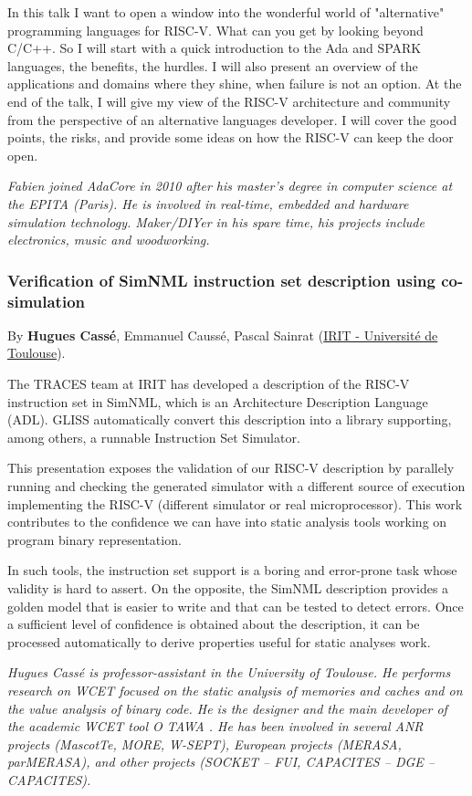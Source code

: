 \documentclass[a4paper, 10pt]{article}
\begin{document}
{In this talk I want to open a window into the wonderful world of
"alternative" programming languages for RISC-V. What can you get by
looking beyond C/C++.
So I will start with a quick introduction to the Ada and SPARK
languages, the benefits, the hurdles. I will also present an overview of
the applications and domains where they shine, when failure is not an
option.
At the end of the talk, I will give my view of the RISC-V architecture
and community from the perspective of an alternative languages
developer. I will cover the good points, the risks, and provide some
ideas on how the RISC-V can keep the door open.

\emph{\footnotesize Fabien joined AdaCore in 2010 after his master's degree in computer science at the EPITA (Paris). He is involved in real-time, embedded and hardware simulation technology. Maker/DIYer in his spare time, his projects include electronics, music and woodworking.}

\subsubsection{Verification of SimNML instruction set description using co-simulation}
\label{sec:org49f51bd}
By \textbf{Hugues Cassé}, Emmanuel Caussé, Pascal Sainrat (\href{https://www.irit.fr/-Equipe-TRACES-?lang=fr}{IRIT - Université de Toulouse}).

The TRACES team at IRIT has developed a description of the RISC-V
instruction set in SimNML, which is an Architecture Description
Language (ADL). GLISS automatically convert this description into a
library supporting, among others, a runnable Instruction Set
Simulator.

This presentation exposes the validation of our RISC-V description by
parallely running and checking the generated simulator with a
different source of execution implementing the RISC-V (different
simulator or real microprocessor).  This work contributes to the
confidence we can have into static analysis tools working on program
binary representation.

In such tools, the instruction set support is a boring and error-prone
task whose validity is hard to assert. On the opposite, the SimNML
description provides a golden model that is easier to write and that
can be tested to detect errors. Once a sufficient level of confidence
is obtained about the description, it can be processed automatically
to derive properties useful for static analyses work.

\emph{\footnotesize Hugues Cassé is professor-assistant in the University of Toulouse. He performs research on WCET focused on the static analysis of memories and caches and on the value analysis of binary code. He is the designer and the main developer of the academic WCET tool O TAWA . He has been involved in several ANR projects (MascotTe, MORE, W-SEPT), European projects (MERASA, parMERASA), and other projects (SOCKET – FUI, CAPACITES – DGE -- CAPACITES).}
}
\end{document}
